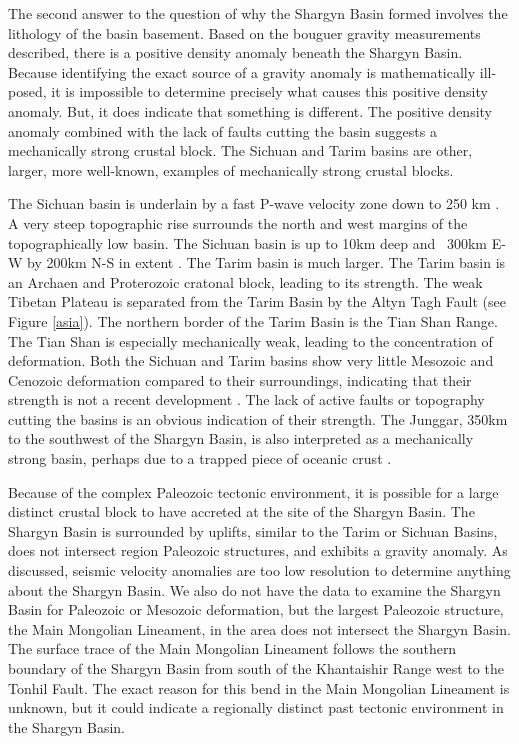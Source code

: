 	The second answer to the question of why the Shargyn Basin formed involves the lithology of the basin basement. Based on the bouguer gravity measurements described, there is a positive density anomaly beneath the Shargyn Basin. Because identifying the exact source of a gravity anomaly is mathematically ill-posed, it is impossible to determine precisely what causes this positive density anomaly. But, it does indicate that something is different. The positive density anomaly combined with the lack of faults cutting the basin suggests a mechanically strong crustal block. The Sichuan and Tarim basins are other, larger, more well-known, examples of mechanically strong crustal blocks. 
	
	The Sichuan basin is underlain by a fast P-wave velocity zone down to 250 km \citep{Royden2008}. A very steep topographic rise surrounds the north and west margins of the topographically low basin. The Sichuan basin is up to 10km deep and ~300km E-W by 200km N-S in extent \citep{Burchfiel2008}. The Tarim basin is much larger. The Tarim basin is an Archaen and Proterozoic cratonal block, leading to its strength\citep{Lu2008}. The weak Tibetan Plateau is separated from the Tarim Basin by the Altyn Tagh Fault (see Figure \ref{asia}). The northern border of the Tarim Basin is the Tian Shan Range. The Tian Shan is especially mechanically weak, leading to the concentration of deformation. Both the Sichuan and Tarim basins show very little Mesozoic and Cenozoic deformation compared to their surroundings, indicating that their strength is not a recent development \citep{Neil1997}. The lack of active faults or topography cutting the basins is an obvious indication of their strength. The Junggar, 350km to the southwest of the Shargyn Basin, is also interpreted as a mechanically strong basin, perhaps due to a trapped piece of oceanic crust \citep{Carroll1990a}. 

	Because of the complex Paleozoic tectonic environment, it is possible for a large distinct crustal block to have accreted at the site of the Shargyn Basin. The Shargyn Basin is surrounded by uplifts, similar to the Tarim or Sichuan Basins, does not intersect region Paleozoic structures, and exhibits a gravity anomaly. As discussed, seismic velocity anomalies are too low resolution to determine anything about the Shargyn Basin. We also do not have the data to examine the Shargyn Basin for Paleozoic or Mesozoic deformation, but the largest Paleozoic structure, the Main Mongolian Lineament, in the area does not intersect the Shargyn Basin. The surface trace of the Main Mongolian Lineament follows the southern boundary of the Shargyn Basin from south of the Khantaishir Range west to the Tonhil Fault. The exact reason for this bend in the Main Mongolian Lineament is unknown, but it could indicate a regionally distinct past tectonic environment in the Shargyn Basin.

